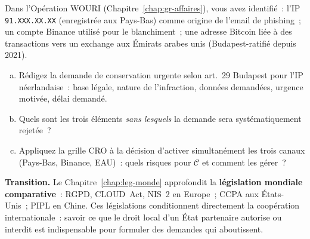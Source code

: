 \begin{boxexo}[title={\ding{45}\quad Exercice~10.3 --- Rédaction de demande de conservation \niveauexpert}]
Dans l'Opération WOURI (Chapitre~\ref{chap:gr-affaires}), vous avez
identifié~: l'IP \texttt{91.XXX.XX.XX} (enregistrée aux Pays-Bas) comme
origine de l'email de phishing~; un compte Binance utilisé pour le
blanchiment~; une adresse Bitcoin liée à des transactions vers un exchange
aux Émirats arabes unis (Budapest-ratifié depuis 2021).

\begin{enumerate}[(a)]
    \item Rédigez la demande de conservation urgente selon art.~29 Budapest
          pour l'IP néerlandaise~: base légale, nature de l'infraction,
          données demandées, urgence motivée, délai demandé.
    \item Quels sont les trois éléments \emph{sans lesquels} la demande
          sera systématiquement rejetée~?
    \item Appliquez la grille CRO à la décision d'activer simultanément
          les trois canaux (Pays-Bas, Binance, EAU)~: quels risques
          pour $\mathcal{C}$ et comment les gérer~?
\end{enumerate}
\end{boxexo}

\bigskip

\begin{boxinfo}
\textbf{Transition.} Le Chapitre~\ref{chap:leg-monde} approfondit la
\textbf{législation mondiale comparative}~: RGPD, CLOUD~Act, NIS~2 en
Europe~; CCPA aux États-Unis~; PIPL en Chine. Ces législations
conditionnent directement la coopération internationale~: savoir ce que
le droit local d'un État partenaire autorise ou interdit est
indispensable pour formuler des demandes qui aboutissent.
\end{boxinfo}
